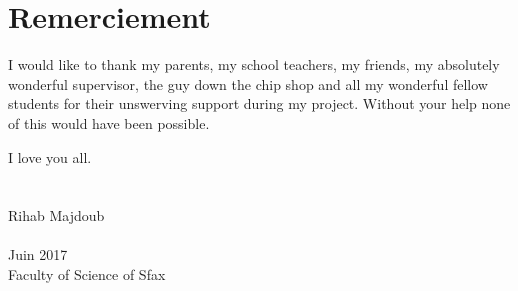 \cleardoublepage
{}
{}
\section*{Remerciement}
\vspace{1.0in}
I would like to thank my parents, my school teachers, my friends, my
absolutely wonderful supervisor, the guy down the chip shop and all
my wonderful fellow students for their unswerving support during my
project. Without your help none of this would have been possible.

I love you all.
\\
\\
\\
Rihab Majdoub
\\
\\
Juin 2017
\\
Faculty of Science of Sfax
